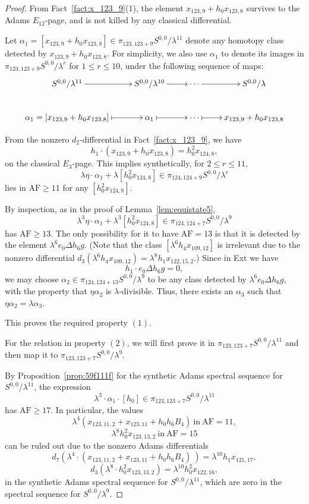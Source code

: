 \documentclass{amsart}
\numberwithin{equation}{section}
\newcommand{\AF}{\mathrm{AF}}
\begin{document}
\begin{proof}
From Fact~\ref{fact:x_123_9}(1), the element $x_{123,9}+h_0x_{123,8}$ survives to the Adams $E_{12}$-page, and is not killed by any classical differential.

Let $\alpha_1 = [x_{123,9}+h_0x_{123,8}] \in \pi_{123,123+9} S^{0,0}/\lambda^{11}$ denote any homotopy class detected by $x_{123,9}+h_0x_{123,8}$. For simplicity, we also use  $\alpha_1$ to denote its images in $\pi_{123,123+9} S^{0,0}/\lambda^r$ for $1 \leq r \leq 10$, under the following sequence of maps:
$$
\xymatrix{
S^{0,0}/\lambda^{11} \ar[r] & S^{0,0}/\lambda^{10} \ar[r] & \cdots \ar[r] & S^{0,0}/\lambda \\
\alpha_1 = [x_{123,9}+h_0x_{123,8}] \ar@{|->}[r] & \alpha_1 \ar@{|->}[r] & \cdots \ar@{|->}[r] & x_{123,9}+h_0x_{123,8}
}$$

From the nonzero $d_2$-differential in Fact~\ref{fact:x_123_9},  we have 
$$h_1 \cdot (x_{123,9}+h_0x_{123,8}) = h_0^2x_{124,8},$$
on the classical $E_3$-page. This implies synthetically, for $2 \leq r \leq 11$,
$$\lambda \eta \cdot \alpha_1 + \lambda [h_0^2 x_{124,8}] \in \pi_{124,124+9} S^{0,0}/\lambda^r$$
lies in $\AF \ge 11$ for any $[h_0^2 x_{124,8}]$.

%
%
%
%

By inspection, as in the proof of Lemma~\ref{lem:equistate5}, $$\lambda^3 \eta \cdot \alpha_1 + \lambda^3 [h_0^2 x_{124,8}] \in \pi_{124,124+7} S^{0,0}/\lambda^9$$
has $\AF \ge 13$. The only possibility for it to have $\AF=13$ is that it is detected by the element $\lambda^6 e_0 \Delta h_6g$. (Note that the class $[\lambda^6 h_4 x_{109,12}]$ is irrelevant due to the nonzero differential $d_3(\lambda^6 h_4 x_{109,12}) = \lambda^8 h_1x_{122,15,2}$.) Since in Ext we have 
$$h_1 \cdot e_0 \Delta h_6g = 0,$$
we may choose $\alpha_2 \in \pi_{124,124+13} S^{0,0}/\lambda^9$ to be any class detected by $\lambda^6 e_0 \Delta h_6g$, with the property that $\eta \alpha_2$ is $\lambda$-divisible. Thus, there exists an $\alpha_3$ such that $\eta \alpha_2 = \lambda  \alpha_3$.

This proves the required property $(1)$.

For the relation in property $(2)$, we will first prove it in $\pi_{123,123+7} S^{0,0}/\lambda^{11}$ and then map it to $\pi_{123,123+7} S^{0,0}/\lambda^9$.

By Proposition~\ref{prop:59f111f} for the synthetic Adams spectral sequence for $S^{0,0}/\lambda^{11}$, the expression 
$$\lambda^3 \cdot \alpha_1 \cdot [h_0] \in  \pi_{123,123+7} S^{0,0}/\lambda^{11}$$
has $\AF \ge 17$. %
In particular, the values $$\lambda^4(x_{123,11,2}+x_{123,11}+h_0h_6B_4) \ \text{in} \ \AF=11,$$ 
$$\lambda^8 h_0^2x_{123,13,2} \ \text{in} \ \AF=15$$
can be ruled out due to the nonzero Adams differentials
$$d_7( \lambda^4 \cdot (x_{123,11,2}+x_{123,11}+h_0h_6B_4) \ ) = \lambda^{10} h_1x_{121,17},$$
$$d_3 (\lambda^8 \cdot h_0^2x_{123,13,2}) = \lambda^{10} h_0^2 x_{122,16},$$
in the synthetic Adams spectral sequence for $S^{0,0}/\lambda^{11}$, which are zero in the spectral sequence for $S^{0,0}/\lambda^{9}$.


\end{proof}
\end{document}
